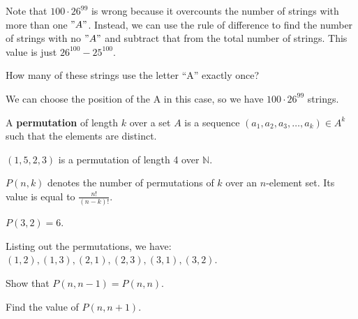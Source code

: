 Note that \( 100\cdot 26^{99}  \) is wrong because it overcounts the number of strings with more than one \( "A" \). Instead, we can use the rule of difference to find the number of strings with no \( "A" \) and subtract that from the total number of strings. This value is just \( 26^{100}-25^{100}   \).

\begin{eg}
	How many of these strings use the letter ``A'' exactly once?
\end{eg}

We can choose the position of the A in this case, so we have \( 100 \cdot 26^{99} \) strings.

\begin{definition}
	A \textbf{permutation} of length \( k \) over a set \( A \) is a sequence \( (a_{1},a_{2},a_{3},\ldots ,a_k) \in A^k \) such that the elements are distinct. 
\end{definition}

\begin{eg}
	\( (1,5,2,3) \) is a permutation of length 4 over \( \mathbb{N} \).
\end{eg}

\begin{notation}
	\( P(n,k) \) denotes the number of permutations of \( k \) over an \( n \)-element set. Its value is equal to \( \frac{n!}{(n-k)!} \).
\end{notation}

\begin{eg}
	\( P(3,2)  = 6\).
\end{eg}

Listing out the permutations, we have: \( (1,2),(1,3),(2,1),(2,3),(3,1),(3,2) \).

Show that \( P(n,n-1) = P(n,n) \).

Find the value of \( P(n,n+1) \).
